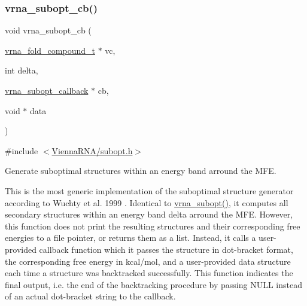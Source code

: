 \subsubsection{\texorpdfstring{vrna\+\_\+subopt\+\_\+cb()}{vrna\_subopt\_cb()}}
{\footnotesize\ttfamily void vrna\+\_\+subopt\+\_\+cb (\begin{DoxyParamCaption}\item[{\hyperlink{group__fold__compound_ga1b0cef17fd40466cef5968eaeeff6166}{vrna\+\_\+fold\+\_\+compound\+\_\+t} $\ast$}]{vc,  }\item[{int}]{delta,  }\item[{\hyperlink{group__subopt__wuchty_gaa0270c66d04f59e750401695b8282e04}{vrna\+\_\+subopt\+\_\+callback} $\ast$}]{cb,  }\item[{void $\ast$}]{data }\end{DoxyParamCaption})}



{\ttfamily \#include $<$\hyperlink{subopt_8h}{Vienna\+R\+N\+A/subopt.\+h}$>$}



Generate suboptimal structures within an energy band arround the M\+FE. 

This is the most generic implementation of the suboptimal structure generator according to Wuchty et al. 1999 \cite{wuchty:1999}. Identical to \hyperlink{group__subopt__wuchty_ga0f11d738fb8c8b1885a90c11c8931ff6}{vrna\+\_\+subopt()}, it computes all secondary structures within an energy band {\ttfamily delta} arround the M\+FE. However, this function does not print the resulting structures and their corresponding free energies to a file pointer, or returns them as a list. Instead, it calls a user-\/provided callback function which it passes the structure in dot-\/bracket format, the corresponding free energy in kcal/mol, and a user-\/provided data structure each time a structure was backtracked successfully. This function indicates the final output, i.\+e. the end of the backtracking procedure by passing N\+U\+LL instead of an actual dot-\/bracket string to the callback.

